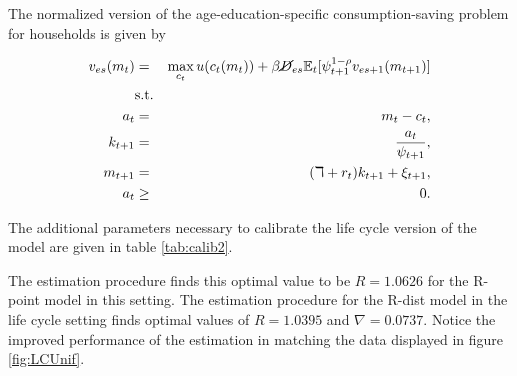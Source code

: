 \par The normalized version of the age-education-specific consumption-saving problem for households is given by

\begin{eqnarray*}
  v_{es}(m_t) &=& \max_{c_t} u(c_t(m_t)) + \beta \cancel{D}_{es} \mathbb{E}_{t}[\psi_{t+1}^{1-\rho}v_{es + 1}(m_{t+1})] \\
  &\text{s.t.}& \\
  a_t &=& m_t - c_t, \\
  k_{t+1} &=& \frac{a_t}{\psi_{t+1}}, \\
  m_{t+1} &=& (\daleth + r_t)k_{t+1} + \xi_{t+1}, \\
  a_t &\geq& 0.
\end{eqnarray*}

\par The additional parameters necessary to calibrate the life cycle version of the model are given in table \ref{tab:calib2}.

\unskip

\par The estimation procedure finds this optimal value to be $R = 1.0626$ for the R-point model in this setting. The estimation procedure for the R-dist model in the life cycle setting finds optimal values of $R = 1.0395$ and $\nabla = 0.0737$. Notice the improved performance of the estimation in matching the data displayed in figure \ref{fig:LCUnif}.

